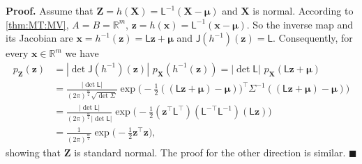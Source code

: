 \documentclass[10pt]{article}
\theoremstyle{definition}
\newenvironment{prf}{\noindent\textbf{Proof.}}{\hfill$\blacksquare$}
\begin{document}
\begin{prf}
Assume that $\mathbf{Z}=h(\mathbf{X})=\mathsf{L}^{-1}(\mathbf{X}-\boldsymbol{\mu})$ and $\mathbf{X}$ is normal. According to \cref{thm:MT:MV}, $A=B=\mathbb{R}^m$, $\mathbf{z}=h(\mathbf{x})=\mathsf{L}^{-1}(\mathbf{x}-\boldsymbol{\mu})$. So the inverse map and its Jacobian are  $\mathbf{x}=h^{-1}(\mathbf{z})=\mathsf{L}\mathbf{z}+\boldsymbol{\mu}$ and $\mathsf{J}(h^{-1})(\mathbf{z}) = \mathsf{L}$. Consequently, for every $\mathbf{x}\in\mathbb{R}^m$ we have
\begin{align*}
p_{\mathbf{Z}}(\mathbf{z}) &= |\det\mathsf{J}(h^{-1})(\mathbf{z})| \,\, p_{\mathbf{X}}(h^{-1}(\mathbf{z}))  = |\det\mathsf{L}|\,\, p_{\mathbf{X}}(\mathsf{L}\mathbf{z}+\boldsymbol{\mu}) \\
&= \frac{|\det\mathsf{L}|}{(2\pi)^{\frac{m}{2}} \sqrt{\det\mathsf{\Sigma}}} \exp \Big(-\frac{1}{2} ((\mathsf{L}\mathbf{z}+\boldsymbol{\mu})-\boldsymbol{\mu}))^{\top}\mathsf{\Sigma}^{-1}((\mathsf{L}\mathbf{z}+\boldsymbol{\mu})-\boldsymbol{\mu}) \Big)\\
&= \frac{|\det\mathsf{L}|}{(2\pi)^{\frac{m}{2}}|\det\mathsf{L}|} \exp \Big(-\frac{1}{2} (\mathbf{z}^{\top}\mathsf{L}^{\top})(\mathsf{L}^{-\top} \mathsf{L}^{-1})(\mathsf{L}\mathbf{z}) \Big)\\
&=\frac{1}{(2\pi)^{\frac{m}{2}}} \exp \Big(-\frac{1}{2} \mathbf{z}^{\top} \mathbf{z} \Big),
\end{align*}
showing that $\mathbf{Z}$ is standard normal. The proof for the other direction is similar.
\end{prf}
\end{document}
